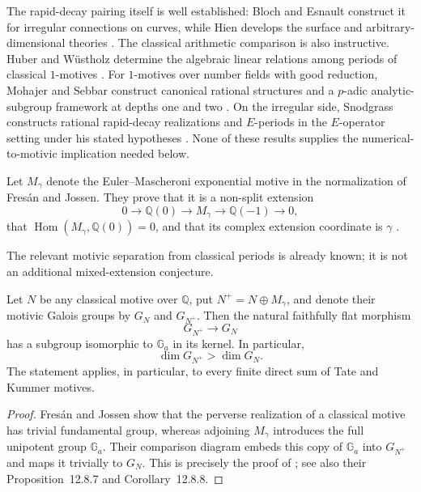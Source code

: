 The rapid-decay pairing itself is well established: Bloch and Esnault
construct it for irregular connections on curves, while Hien develops the
surface and arbitrary-dimensional theories
\cite{BlochEsnault2004,Hien2007,Hien2009}.  The classical arithmetic
comparison is also instructive.  Huber and W\"ustholz determine the
algebraic linear relations among periods of classical $1$-motives
\cite{HuberWustholz}.  For $1$-motives over number fields with good
reduction, Mohajer and Sebbar construct canonical rational structures and a
$p$-adic analytic-subgroup framework at depths one and two
\cite{MohajerSebbar2025}.  On the irregular side, Snodgrass constructs
rational rapid-decay realizations and $E$-periods in the $E$-operator
setting under his stated hypotheses \cite{Snodgrass2026}.  None of these
results supplies the numerical-to-motivic implication needed below.

Let $M_\gamma$ denote the Euler--Mascheroni exponential motive in the
normalization of Fres\'an and Jossen.  They prove that it is a non-split
extension
\begin{equation}\label{eq:euler-motive-extension}
 0\longrightarrow\mathbb Q(0)
 \longrightarrow M_\gamma
 \longrightarrow\mathbb Q(-1)
 \longrightarrow0,
\end{equation}
that $\operatorname{Hom}(M_\gamma,\mathbb Q(0))=0$, and that its complex
extension coordinate is $\gamma$ \cite[Sec.~12.8]{FresanJossen}.

The relevant motivic separation from classical periods is already known;
it is not an additional mixed-extension conjecture.

\begin{theorem}
\label{thm:fresan-jossen-classical-separation}
Let $N$ be any classical motive over $\mathbb Q$, put
$N^+=N\oplus M_\gamma$, and denote their motivic Galois groups by
$G_N$ and $G_{N^+}$.  Then the natural faithfully flat morphism
\[
 G_{N^+}\longrightarrow G_N
\]
has a subgroup isomorphic to $\mathbb G_a$ in its kernel.  In particular,
\begin{equation}\label{eq:fresan-jossen-dimension-jump}
 \dim G_{N^+}>\dim G_N.
\end{equation}
The statement applies, in particular, to every finite direct sum of Tate
and Kummer motives.
\end{theorem}

\begin{proof}
Fres\'an and Jossen show that the perverse realization of a classical
motive has trivial fundamental group, whereas adjoining $M_\gamma$
introduces the full unipotent group $\mathbb G_a$.  Their comparison diagram
embeds this copy of $\mathbb G_a$ into $G_{N^+}$ and maps it trivially to
$G_N$.  This is precisely the proof of
\cite[Cor.~12.8.12]{FresanJossen}; see also their
Proposition~12.8.7 and Corollary~12.8.8.
\end{proof}

